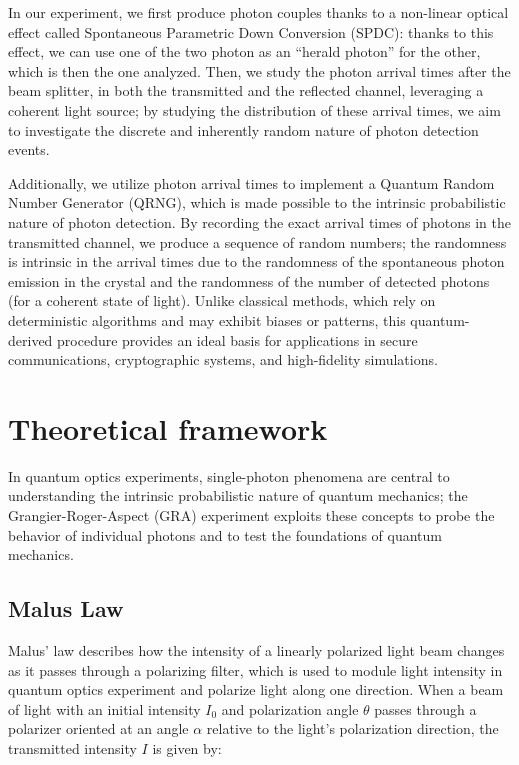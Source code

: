 \documentclass[prl,twocolumn]{revtex4-1}
\begin{document}
In our experiment, we first produce photon couples thanks to a non-linear optical effect called Spontaneous Parametric Down Conversion (SPDC): thanks to this effect, we can use one of the two photon as an ``herald photon'' for the other, which is then the one analyzed. Then, we study the photon arrival times after the beam splitter, in both the transmitted and the reflected channel, leveraging a coherent light source; by studying the distribution of these arrival times, we aim to investigate the discrete and inherently random nature of photon detection events.

Additionally, we utilize photon arrival times to implement a Quantum Random Number Generator (QRNG), which is made possible to the intrinsic probabilistic nature of photon detection. By recording the exact arrival times of photons in the transmitted channel, we produce a sequence of random numbers; the randomness is intrinsic in the arrival times due to the randomness of the spontaneous photon emission in the crystal and the randomness of the number of detected photons (for a coherent state of light). Unlike classical methods, which rely on deterministic algorithms and may exhibit biases or patterns, this quantum-derived procedure provides an ideal basis for applications in secure communications, cryptographic systems, and high-fidelity simulations.

\section{Theoretical framework}
In quantum optics experiments, single-photon phenomena are central to understanding the intrinsic probabilistic nature of quantum mechanics; the Grangier-Roger-Aspect (GRA) experiment exploits these concepts to probe the behavior of individual photons and to test the foundations of quantum mechanics.

\subsection{Malus Law}
Malus' law describes how the intensity of a linearly polarized light beam changes as it passes through a polarizing filter, which is used to module light intensity in quantum optics experiment and polarize light along one direction. When a beam of light with an initial intensity $I_0$ and polarization angle $\theta$ passes through a polarizer oriented at an angle $\alpha$ relative to the light's polarization direction, the transmitted intensity $I$ is given by:
\end{document}

